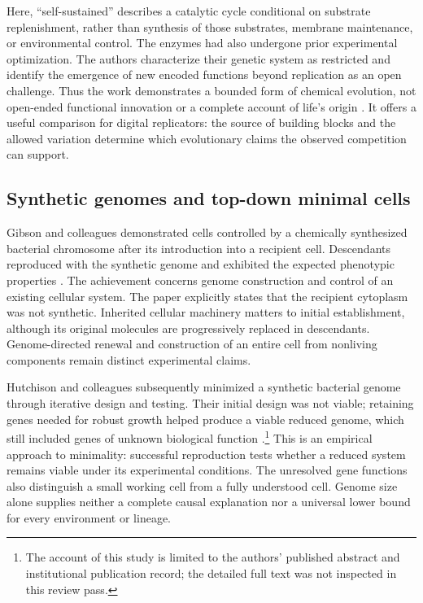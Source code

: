 Here, ``self-sustained'' describes a catalytic cycle conditional on substrate
replenishment, rather than synthesis of those substrates, membrane maintenance,
or environmental control. The enzymes had also undergone prior experimental
optimization. The authors characterize their genetic system as restricted and
identify the emergence of new encoded functions beyond replication as an open
challenge. Thus the work demonstrates a bounded form of chemical evolution,
not open-ended functional innovation or a complete account of life's origin
\citep{wetLincoln2009}. It offers a useful comparison for digital replicators:
the source of building blocks and the allowed variation determine which
evolutionary claims the observed competition can support.

\subsection{Synthetic genomes and top-down minimal cells}

Gibson and colleagues demonstrated cells controlled by a chemically synthesized
bacterial chromosome after its introduction into a recipient cell. Descendants
reproduced with the synthetic genome and exhibited the expected phenotypic
properties \citep{wetGibson2010}. The achievement concerns genome construction
and control of an existing cellular system. The paper explicitly states that
the recipient cytoplasm was not synthetic. Inherited cellular machinery matters
to initial establishment, although its original molecules are progressively
replaced in descendants.
Genome-directed renewal and construction of an entire cell from nonliving
components remain distinct experimental claims.

Hutchison and colleagues subsequently minimized a synthetic bacterial genome
through iterative design and testing. Their initial design was not viable;
retaining genes needed for robust growth helped produce a viable reduced
genome, which still included genes of unknown biological function
\citep{wetHutchison2016}.\footnote{The account of this study is limited to
the authors' published abstract and institutional publication record;
the detailed full text was not inspected in this review pass.}
This is an empirical approach to minimality: successful reproduction tests
whether a reduced system remains viable under its experimental conditions.
The unresolved gene functions also distinguish a small working cell from a
fully understood cell. Genome size alone supplies neither a complete causal
explanation nor a universal lower bound for every environment or lineage.

